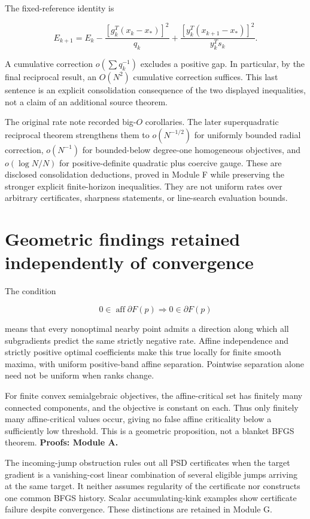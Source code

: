 \documentclass[10pt,oneside,openany]{book}
\theoremstyle{remark}\newtheorem{remark}{Remark}[chapter]
\begin{document}
The fixed-reference identity is

\[E_{k+1}=E_k-\frac{[g_k^T(x_k-x_*)]^2}{q_k}
+\frac{[y_k^T(x_{k+1}-x_*)]^2}{y_k^Ts_k}.\]

A cumulative correction \(o(\sum q_k^{-1})\) excludes a positive gap. In particular, by the final reciprocal result, an \(O(N^2)\) cumulative correction suffices. This last sentence is an explicit consolidation consequence of the two displayed inequalities, not a claim of an additional source theorem.

The original rate note recorded big-\(O\) corollaries. The later superquadratic reciprocal theorem strengthens them to \(o(N^{-1/2})\) for uniformly bounded radial correction, \(o(N^{-1})\) for bounded-below degree-one homogeneous objectives, and \(o(\log N/N)\) for positive-definite quadratic plus coercive gauge. These are disclosed consolidation deductions, proved in Module F while preserving the stronger explicit finite-horizon inequalities. They are not uniform rates over arbitrary certificates, sharpness statements, or line-search evaluation bounds.

\section{Geometric findings retained independently of convergence}\label{geometric-findings-retained-independently-of-convergence}

The condition

\[0\in\operatorname{aff}\partial F(p)\Longrightarrow0\in\partial F(p)\]

means that every nonoptimal nearby point admits a direction along which all subgradients predict the same strictly negative rate. Affine independence and strictly positive optimal coefficients make this true locally for finite smooth maxima, with uniform positive-band affine separation. Pointwise separation alone need not be uniform when ranks change.

For finite convex semialgebraic objectives, the affine-critical set has finitely many connected components, and the objective is constant on each. Thus only finitely many affine-critical values occur, giving no false affine criticality below a sufficiently low threshold. This is a geometric proposition, not a blanket BFGS theorem. \textbf{Proofs: Module A.}

The incoming-jump obstruction rules out all PSD certificates when the target gradient is a vanishing-cost linear combination of several eligible jumps arriving at the same target. It neither assumes regularity of the certificate nor constructs one common BFGS history. Scalar accumulating-kink examples show certificate failure despite convergence. These distinctions are retained in Module G.
\end{document}

